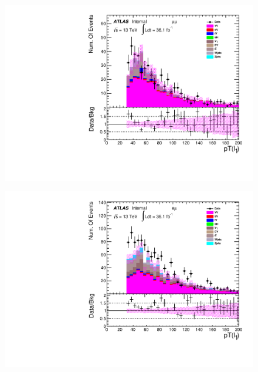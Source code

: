 \begin{figure}[h]
\begin{minipage}[t]{0.3\linewidth}
 \label{fig:nominal:pt_leadinglepton_ee.pdf}
 \end{minipage}
\begin{minipage}[t]{0.3\linewidth}
 \centering
 \includegraphics[width=1.0\textwidth,angle=-90]{fig/nominal/pt_leadinglepton_mumu.pdf}
 \label{fig:nominal:pt_leadinglepton_mumu.pdf}
 \end{minipage}
\begin{minipage}[t]{0.3\linewidth}
 \centering
 \includegraphics[width=1.0\textwidth,angle=-90]{fig/nominal/pt_leadinglepton_emu.pdf}
 \label{fig:nominal:pt_leadinglepton_emu.pdf}
 \end{minipage}
\begin{minipage}[t]{0.3\linewidth}
 \centering

\end{minipage}
\end{figure}
